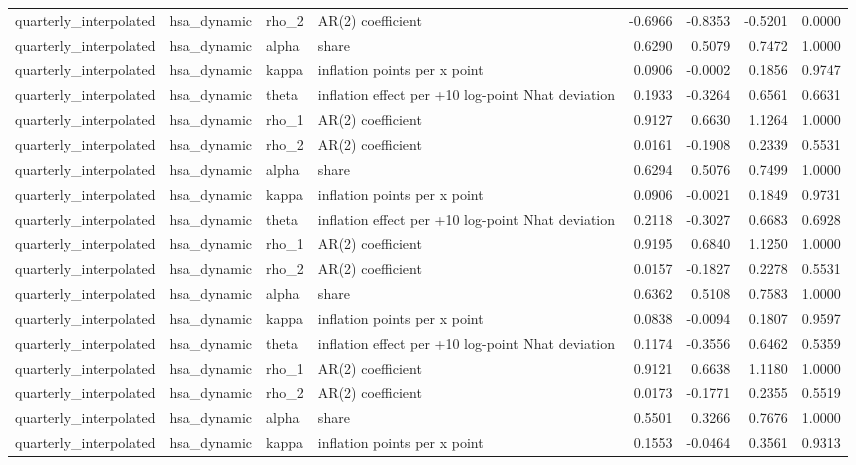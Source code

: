 \begin{tabular}{llllrrrr}
quarterly\_interpolated & hsa\_dynamic & rho\_2 & AR(2) coefficient & -0.6966 & -0.8353 & -0.5201 & 0.0000 \\
quarterly\_interpolated & hsa\_dynamic & alpha & share & 0.6290 & 0.5079 & 0.7472 & 1.0000 \\
quarterly\_interpolated & hsa\_dynamic & kappa & inflation points per x point & 0.0906 & -0.0002 & 0.1856 & 0.9747 \\
quarterly\_interpolated & hsa\_dynamic & theta & inflation effect per +10 log-point Nhat deviation & 0.1933 & -0.3264 & 0.6561 & 0.6631 \\
quarterly\_interpolated & hsa\_dynamic & rho\_1 & AR(2) coefficient & 0.9127 & 0.6630 & 1.1264 & 1.0000 \\
quarterly\_interpolated & hsa\_dynamic & rho\_2 & AR(2) coefficient & 0.0161 & -0.1908 & 0.2339 & 0.5531 \\
quarterly\_interpolated & hsa\_dynamic & alpha & share & 0.6294 & 0.5076 & 0.7499 & 1.0000 \\
quarterly\_interpolated & hsa\_dynamic & kappa & inflation points per x point & 0.0906 & -0.0021 & 0.1849 & 0.9731 \\
quarterly\_interpolated & hsa\_dynamic & theta & inflation effect per +10 log-point Nhat deviation & 0.2118 & -0.3027 & 0.6683 & 0.6928 \\
quarterly\_interpolated & hsa\_dynamic & rho\_1 & AR(2) coefficient & 0.9195 & 0.6840 & 1.1250 & 1.0000 \\
quarterly\_interpolated & hsa\_dynamic & rho\_2 & AR(2) coefficient & 0.0157 & -0.1827 & 0.2278 & 0.5531 \\
quarterly\_interpolated & hsa\_dynamic & alpha & share & 0.6362 & 0.5108 & 0.7583 & 1.0000 \\
quarterly\_interpolated & hsa\_dynamic & kappa & inflation points per x point & 0.0838 & -0.0094 & 0.1807 & 0.9597 \\
quarterly\_interpolated & hsa\_dynamic & theta & inflation effect per +10 log-point Nhat deviation & 0.1174 & -0.3556 & 0.6462 & 0.5359 \\
quarterly\_interpolated & hsa\_dynamic & rho\_1 & AR(2) coefficient & 0.9121 & 0.6638 & 1.1180 & 1.0000 \\
quarterly\_interpolated & hsa\_dynamic & rho\_2 & AR(2) coefficient & 0.0173 & -0.1771 & 0.2355 & 0.5519 \\
quarterly\_interpolated & hsa\_dynamic & alpha & share & 0.5501 & 0.3266 & 0.7676 & 1.0000 \\
quarterly\_interpolated & hsa\_dynamic & kappa & inflation points per x point & 0.1553 & -0.0464 & 0.3561 & 0.9313 \\

\end{tabular}

